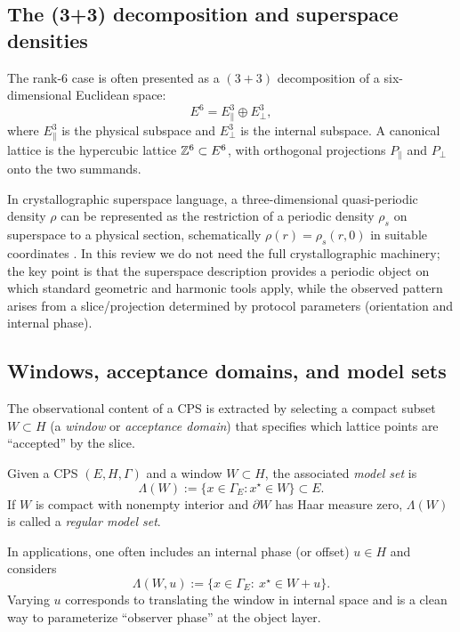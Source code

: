 \subsection{The (3+3) decomposition and superspace densities}\label{sec:superspace:33}

The rank-$6$ case is often presented as a $(3+3)$ decomposition of a six-dimensional Euclidean space:
\[
E^{6}=E_{\parallel}^{3}\oplus E_{\perp}^{3},
\]
where $E_{\parallel}^{3}$ is the physical subspace and $E_{\perp}^{3}$ is the internal subspace. A canonical lattice is the hypercubic lattice $\mathbb{Z}^{6}\subset E^{6}$, with orthogonal projections $P_{\parallel}$ and $P_{\perp}$ onto the two summands.

In crystallographic superspace language, a three-dimensional quasi-periodic density $\rho$ can be represented as the restriction of a periodic density $\rho_s$ on superspace to a physical section, schematically $\rho(r)=\rho_s(r,0)$ in suitable coordinates \cite{IUCRSuperspace}. In this review we do not need the full crystallographic machinery; the key point is that the superspace description provides a periodic object on which standard geometric and harmonic tools apply, while the observed pattern arises from a slice/projection determined by protocol parameters (orientation and internal phase).

\subsection{Windows, acceptance domains, and model sets}\label{sec:superspace:windows}

The observational content of a CPS is extracted by selecting a compact subset $W \subset H$ (a \emph{window} or \emph{acceptance domain}) that specifies which lattice points are ``accepted'' by the slice.

\begin{definition}\label{def:model-set}
Given a CPS $(E,H,\Gamma)$ and a window $W \subset H$, the associated \emph{model set} is
\[
\Lambda(W) := \{x \in \Gamma_E : x^\star \in W\} \subset E.
\]
If $W$ is compact with nonempty interior and $\partial W$ has Haar measure zero, $\Lambda(W)$ is called a \emph{regular model set}.
\end{definition}

\begin{remark}\label{rem:internal-phase}
In applications, one often includes an internal phase (or offset) $u\in H$ and considers
\[
\Lambda(W,u):=\{x\in\Gamma_E:\ x^\star\in W+u\}.
\]
Varying $u$ corresponds to translating the window in internal space and is a clean way to parameterize ``observer phase'' at the object layer.
\end{remark}

